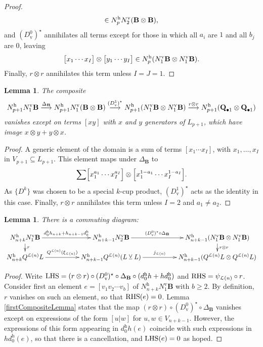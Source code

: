 \documentclass[11pt]{amsart} \renewcommand{\baselinestretch}{1.2}
\theoremstyle{plain}
\newtheorem{lem}[thm]{Lemma}
\theoremstyle{definition}
\renewcommand{\to}{\longrightarrow}
\newcommand{\calL}{\mathcal{L}}
\newcommand{\DeltatubfD}{\Delta_{\mathrm{\textbf{B}}}}
\newcommand{\uver}{^\mathrm{v}}
\newcommand{\uhor}{^\mathrm{h}}
\newcommand{\dver}{_\mathrm{v}}
\newcommand{\smashcoprod}{\veebar}%
\begin{document}
\begin{appendices}
\begin{proof}
\[\in N\uhor_{p}N\uver_2(\textup{\textbf{B}}\otimes\textup{\textbf{B}}),
\]
and $(D\dver^0)^\star$ annihilates all terms except for those in which all $a_i$ are $1$ and all $b_j$ are $0$, leaving
\[\bigl[x_1\cdots x_I\bigr]\otimes
\bigl[y_1\cdots y_I\bigr]\in N\uhor_{p}(N\uver_1\textup{\textbf{B}}\otimes N\uver_1\textup{\textbf{B}}).\]
Finally, $r\otimes r$ annihilates this term unless $I=J=1$.
\end{proof}
\begin{lem}
\label{secondCompositeLemma}
The composite
\[N\uhor_{p+1} N\uver_1\textup{\textbf{B}}\overset{\DeltatubfD}{\to} N\uhor_{p+1}N\uver_1(\textup{\textbf{B}}\otimes\textup{\textbf{B}}) \overset{(D\dver^1)^\star}{\to} N\uhor_{p+1}(N\uver_1\textup{\textbf{B}}\otimes N\uver_1\textup{\textbf{B}})\overset{r\otimes r}{\to}N\uhor_{p+1}(\textup{\textbf{Q}}_{\bullet 1}\otimes \textup{\textbf{Q}}_{\bullet 1})\]
vanishes except on terms $[xy]$ with $x$ and $y$ generators of $ L_{p+1}$, which have image $x\otimes y+y\otimes x$.
\end{lem}
\begin{proof}
A generic element of the domain is a sum of terms $[x_1\cdots x_I]$, with $x_1,\ldots,x_I$ in $V_{p+1}\subseteq L_{p+1}$. This element maps under $\DeltatubfD$ to
\[\sum
\Bigl[x_1^{a_1}\cdots x_I^{a_I}\Bigr]\otimes
\Bigl[x_1^{1-a_1}\cdots x_I^{1-a_I}\Bigr].\]
As $\{D^k\}$ was chosen to be a special $k$-cup product, $(D\dver^1)^\star$ acts as the identity in this case.
Finally, $r\otimes r$ annihilates this term unless $I=2$ and $a_1\neq a_2$.
\end{proof}
\begin{lem}
\label{commuting rectangle lemma for lie operations}
There is a commuting diagram:
\[\xymatrix@R=4mm@C=18mm{
N\uhor_{n+k}N\uver_1\textup{\textbf{B}} \ar[r]^-{d\uhor_0h_{n+k}+h_{n+k-1}d\uhor_0}
\ar[d]^-{r}&%
N\uhor_{n+k-1}N\uver_2\textup{\textbf{B}} \ar[r]^-{(D\dver^0)^\star\circ\DeltatubfD}&%
N\uhor_{n+k-1}(N\uver_1\textup{\textbf{B}}\otimes N\uver_1\textup{\textbf{B}})\ar[d]^-{r\otimes r}
\\%
N\uhor_{n+k}Q^{\calL(n)} L  \ar[r]^-{Q^{\calL(n)}(\xi_{\calL(n)})}&%
N\uhor_{n+k-1}Q^{\calL(n)}( L\smashcoprod  L) \ar[r]^-{j_{\calL(n)}}&%
N\uhor_{n+k-1}(Q^{\calL(n)} L \otimes Q^{\calL(n)} L )
}\]
\end{lem}
\begin{proof}
Write
$\textup{LHS}=(r\otimes r)\circ (D\dver^0)^\star\circ\DeltatubfD\circ(d\uhor_0h+hd\uhor_0)$ and $\textup{RHS}= \psi_{\calL(n)}\circ r$.
Consider first an element $e=[v_1v_2\cdots v_b]$ of $N\uhor_{n+k}N\uver_1\textbf{B}$ with $b\geq2$. By definition, $r$ vanishes on such an element, so that $\textup{RHS}(e)=0$. Lemma \ref{firstCompositeLemma} states that the map $(r\otimes r)\circ (D\dver^0)^\star\circ\DeltatubfD$ vanishes except on expressions of the form $[u|w]$ for $u,w\in V_{n+k-1}$. However, the expressions of this form appearing in $d\uhor_0h(e)$ coincide with such expressions in $hd\uhor_0(e)$, so that there is a cancellation, and $\textup{LHS}(e)=0$ as hoped. 


\end{proof}
\end{appendices}
\end{document}
